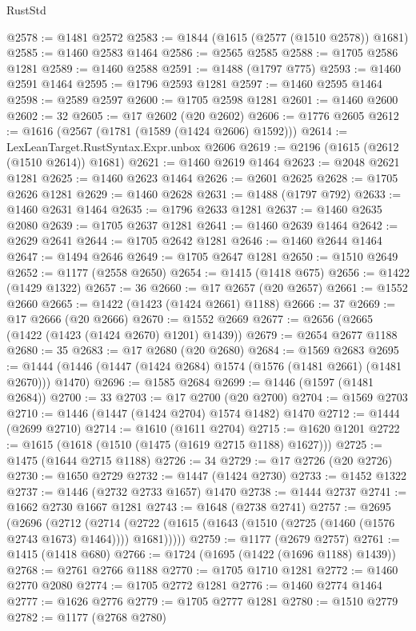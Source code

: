 \begin{lexlean}{RustStd}
\begin{coremodule}
@2578 := @1481 @2572
@2583 := @1844 (@1615 (@2577 (@1510 @2578)) @1681)
@2585 := @1460 @2583 @1464
@2586 := @2565 @2585
@2588 := @1705 @2586 @1281
@2589 := @1460 @2588
@2591 := @1488 (@1797 @775)
@2593 := @1460 @2591 @1464
@2595 := @1796 @2593 @1281
@2597 := @1460 @2595 @1464
@2598 := @2589 @2597
@2600 := @1705 @2598 @1281
@2601 := @1460 @2600
@2602 := 32
@2605 := @17 @2602 (@20 @2602)
@2606 := @1776 @2605
@2612 := @1616 (@2567 (@1781 (@1589 (@1424 @2606) @1592)))
@2614 := LexLeanTarget.RustSyntax.Expr.unbox @2606
@2619 := @2196 (@1615 (@2612 (@1510 @2614)) @1681)
@2621 := @1460 @2619 @1464
@2623 := @2048 @2621 @1281
@2625 := @1460 @2623 @1464
@2626 := @2601 @2625
@2628 := @1705 @2626 @1281
@2629 := @1460 @2628
@2631 := @1488 (@1797 @792)
@2633 := @1460 @2631 @1464
@2635 := @1796 @2633 @1281
@2637 := @1460 @2635 @2080
@2639 := @1705 @2637 @1281
@2641 := @1460 @2639 @1464
@2642 := @2629 @2641
@2644 := @1705 @2642 @1281
@2646 := @1460 @2644 @1464
@2647 := @1494 @2646
@2649 := @1705 @2647 @1281
@2650 := @1510 @2649
@2652 := @1177 (@2558 @2650)
@2654 := @1415 (@1418 @675)
@2656 := @1422 (@1429 @1322)
@2657 := 36
@2660 := @17 @2657 (@20 @2657)
@2661 := @1552 @2660
@2665 := @1422 (@1423 (@1424 @2661) @1188)
@2666 := 37
@2669 := @17 @2666 (@20 @2666)
@2670 := @1552 @2669
@2677 := @2656 (@2665 (@1422 (@1423 (@1424 @2670) @1201) @1439))
@2679 := @2654 @2677 @1188
@2680 := 35
@2683 := @17 @2680 (@20 @2680)
@2684 := @1569 @2683
@2695 := @1444 (@1446 (@1447 (@1424 @2684) @1574 (@1576 (@1481 @2661) (@1481 @2670))) @1470)
@2696 := @1585 @2684
@2699 := @1446 (@1597 (@1481 @2684))
@2700 := 33
@2703 := @17 @2700 (@20 @2700)
@2704 := @1569 @2703
@2710 := @1446 (@1447 (@1424 @2704) @1574 @1482) @1470
@2712 := @1444 (@2699 @2710)
@2714 := @1610 (@1611 @2704)
@2715 := @1620 @1201
@2722 := @1615 (@1618 (@1510 (@1475 (@1619 @2715 @1188) @1627)))
@2725 := @1475 (@1644 @2715 @1188)
@2726 := 34
@2729 := @17 @2726 (@20 @2726)
@2730 := @1650 @2729
@2732 := @1447 (@1424 @2730)
@2733 := @1452 @1322
@2737 := @1446 (@2732 @2733 @1657) @1470
@2738 := @1444 @2737
@2741 := @1662 @2730 @1667 @1281
@2743 := @1648 (@2738 @2741)
@2757 := @2695
    (@2696
      (@2712
        (@2714 (@2722 (@1615 (@1643 (@1510 (@2725 (@1460 (@1576 @2743 @1673) @1464)))) @1681)))))
@2759 := @1177 (@2679 @2757)
@2761 := @1415 (@1418 @680)
@2766 := @1724 (@1695 (@1422 (@1696 @1188) @1439))
@2768 := @2761 @2766 @1188
@2770 := @1705 @1710 @1281
@2772 := @1460 @2770 @2080
@2774 := @1705 @2772 @1281
@2776 := @1460 @2774 @1464
@2777 := @1626 @2776
@2779 := @1705 @2777 @1281
@2780 := @1510 @2779
@2782 := @1177 (@2768 @2780)

\end{coremodule}
\end{lexlean}
